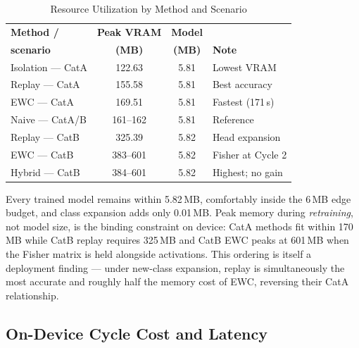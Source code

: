\documentclass[journal]{IEEEtran}
\begin{document}
\begin{table}[!tbp]
\caption{Resource Utilization by Method and Scenario}
\label{tab:resources}
\centering
\small
\setlength{\tabcolsep}{4pt}
\begin{tabular}{@{}lccl@{}}
\toprule
\textbf{Method /} & \textbf{Peak VRAM} & \textbf{Model} & \\
\textbf{scenario} & \textbf{(MB)} & \textbf{(MB)} & \textbf{Note} \\
\midrule
Isolation --- CatA & 122.63   & 5.81 & Lowest VRAM \\
Replay --- CatA    & 155.58   & 5.81 & Best accuracy \\
EWC --- CatA       & 169.51   & 5.81 & Fastest (171\,s) \\
Naive --- CatA/B   & 161--162 & 5.81 & Reference \\
Replay --- CatB    & 325.39   & 5.82 & Head expansion \\
EWC --- CatB       & 383--601 & 5.82 & Fisher at Cycle 2 \\
Hybrid --- CatB    & 384--601 & 5.82 & Highest; no gain \\
\bottomrule
\end{tabular}
\end{table}

Every trained model remains within 5.82\,MB, comfortably inside the 6\,MB edge
budget, and class expansion adds only 0.01\,MB. Peak memory during \emph{retraining},
not model size, is the binding constraint on device: CatA methods fit within 170\,MB
while CatB replay requires 325\,MB and CatB EWC peaks at 601\,MB when the Fisher
matrix is held alongside activations. This ordering is itself a deployment finding ---
under new-class expansion, replay is simultaneously the most accurate and roughly
half the memory cost of EWC, reversing their CatA relationship.

\subsection{On-Device Cycle Cost and Latency}
\label{subsec:ondevice}
\end{document}
